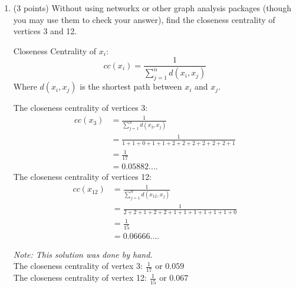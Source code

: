 \documentclass[11pt]{article}
\begin{document}
\begin{enumerate}

    \newpage
    \item (3 points) Without using networkx or other graph analysis packages
    (though you may use them to check your answer), find the closeness
    centrality of vertices 3 and 12.
    \begin{tcolorbox}[width=\linewidth,colback=yellow!5,colframe=yellow!75!black!75,title=Notes]
        Closeness Centrality of $x_i$:
        $$cc(x_{i}) = \frac{1}{\sum_{j=1}^{n} d( x_i , x_j )}$$
        Where $d( x_i , x_j )$ is the shortest path between $x_i$ and $x_j$.
    \end{tcolorbox}
    The closeness centrality of vertices 3:
    \begin{align*}
        cc(x_{3}) &= \frac{1}{\sum_{j=1}^{n} d( x_3 , x_j )} \\
        &= \frac{1}{1 + 1 + 0 + 1 + 1 + 2 + 2 + 2 + 2 + 2 + 2 + 1} \\
        &= \frac{1}{17} \\
        &= 0.05882....
    \end{align*}
    The closeness centrality of vertices 12:
    \begin{align*}
        cc(x_{12}) &= \frac{1}{\sum_{j=1}^{n} d( x_{12} , x_j )} \\
        &= \frac{1}{2+2+1+2+2+1+1+1+1+1+1+0} \\
        &= \frac{1}{15} \\
        &= 0.06666....
    \end{align*}
    \begin{tcolorbox}[width=\linewidth,title=Problem 1 Answer - Closeness Centrality]
        \textit{Note: This solution was done by hand.}\vspace{5pt} \\
        The closeness centrality of vertex 3: $\frac{1}{17}$ or $0.059$ \\
        The closeness centrality of vertex 12: $\frac{1}{15}$ or $0.067$
    \end{tcolorbox}
    

\end{enumerate}
\end{document}
